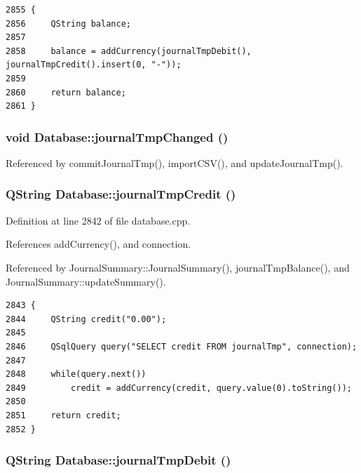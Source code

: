 \footnotesize\begin{verbatim}2855 {
2856     QString balance;
2857     
2858     balance = addCurrency(journalTmpDebit(), journalTmpCredit().insert(0, "-"));
2859     
2860     return balance;
2861 }
\end{verbatim}\normalsize 


\hypertarget{classDatabase_l1}{
\subsubsection[journalTmpChanged]{\setlength{\rightskip}{0pt plus 5cm}void Database::journal\-Tmp\-Changed ()}}
\label{classDatabase_l1}




Referenced by commit\-Journal\-Tmp(), import\-CSV(), and update\-Journal\-Tmp().\hypertarget{classDatabase_a44}{
\subsubsection[journalTmpCredit]{\setlength{\rightskip}{0pt plus 5cm}QString Database::journal\-Tmp\-Credit ()}}
\label{classDatabase_a44}


Definition at line 2842 of file database.cpp.

References add\-Currency(), and connection.

Referenced by Journal\-Summary::Journal\-Summary(), journal\-Tmp\-Balance(), and Journal\-Summary::update\-Summary().

\footnotesize\begin{verbatim}2843 {
2844     QString credit("0.00");
2845     
2846     QSqlQuery query("SELECT credit FROM journalTmp", connection);
2847     
2848     while(query.next())
2849         credit = addCurrency(credit, query.value(0).toString());
2850     
2851     return credit;
2852 }
\end{verbatim}\normalsize 


\hypertarget{classDatabase_a43}{
\subsubsection[journalTmpDebit]{\setlength{\rightskip}{0pt plus 5cm}QString Database::journal\-Tmp\-Debit ()}}
\label{classDatabase_a43}


